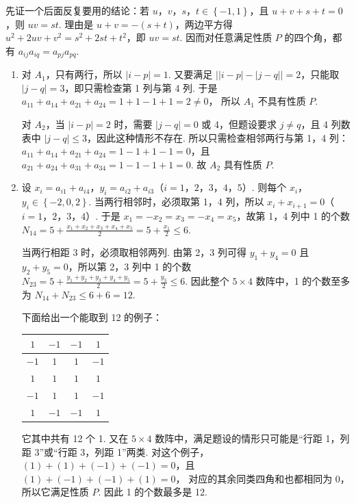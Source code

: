 \begin{solution}
先证一个后面反复要用的结论：若 \(u\)，\(v\)，\(s\)，\(t\in \left\{ -1,1 \right\}\)，且 \( u+v+s+t=0 \)，则 \( uv=st \). 理由是 \( u+v=-(s+t) \)，两边平方得 \( u^2+2uv+v^2=s^2+2st+t^2 \)，即 \( uv=st \). 因而对任意满足性质 \(P\) 的四个角，都有 \( a_{ij}a_{iq}=a_{pj}a_{pq} \).

\begin{enumerate}
\item 对 \(A_1\)，只有两行，所以 \( \left| i-p \right|=1 \). 又要满足 \( \left| \left| i-p \right|-\left| j-q \right| \right|=2 \)，只能取 \( \left| j-q \right|=3 \)，即只需检查第 1 列与第 4 列. 于是 \( a_{11}+a_{14}+a_{21}+a_{24}=1+1-1+1=2\ne 0 \)，
所以 \(A_1\) 不具有性质 \(P\).

对 \(A_2\)，当 \( \left| i-p \right|=2 \) 时，需要 \( \left| j-q \right|=0 \) 或 4，但题设要求 \( j\ne q \)，且 4 列数表中 \( \left| j-q \right| \le 3 \)，因此这种情形不存在. 所以只需检查相邻两行与第 1，4 列：\( a_{11}+a_{14}+a_{21}+a_{24}=1-1+1-1=0 \)，且 \( a_{21}+a_{24}+a_{31}+a_{34}=1-1-1+1=0 \).
故 \(A_2\) 具有性质 \(P\).

\item 设 \( x_i=a_{i1}+a_{i4} \)，\( y_i=a_{i2}+a_{i3} \)（\(i=1\)，\(2\)，\(3\)，\(4\)，\(5\)）.
则每个 \(x_i\)，\(y_i\in \left\{ -2,0,2 \right\}\).
当两行相邻时，必须取第 1，4 列，所以 \( x_i+x_{i+1}=0 \)（\(i=1\)，\(2\)，\(3\)，\(4\)）. 于是 \( x_1=-x_2=x_3=-x_4=x_5 \)，故第 1，4 列中 1 的个数 \( N_{14}=5+\frac{x_1+x_2+x_3+x_4+x_5}{2}=5+\frac{x_1}{2}\le 6 \).

当两行相距 3 时，必须取相邻两列. 由第 2，3 列可得 \( y_1+y_4=0 \) 且 \( y_2+y_5=0 \)，所以第 2，3 列中 1 的个数 \( N_{23}=5+\frac{y_1+y_2+y_3+y_4+y_5}{2}=5+\frac{y_3}{2}\le 6 \).
因此整个 \( 5\times 4 \) 数阵中，1 的个数至多为 \( N_{14}+N_{23}\le 6+6=12 \).

下面给出一个能取到 12 的例子：
\begin{center}
\begin{tabular}{|c|c|c|c|}
\hline
\(1\) & \(-1\) & \(-1\) & \(1\) \\
\hline
\(-1\) & \(1\) & \(1\) & \(-1\) \\
\hline
\(1\) & \(1\) & \(1\) & \(1\) \\
\hline
\(-1\) & \(1\) & \(1\) & \(-1\) \\
\hline
\(1\) & \(-1\) & \(-1\) & \(1\) \\
\hline
\end{tabular}
\end{center}
它其中共有 12 个 1. 又在 \( 5\times 4 \) 数阵中，满足题设的情形只可能是“行距 1，列距 3”或“行距 3，列距 1”两类. 对这个例子，\( \left( 1 \right)+\left( 1 \right)+\left( -1 \right)+\left( -1 \right)=0 \)，且 \( \left( 1 \right)+\left( -1 \right)+\left( -1 \right)+\left( 1 \right)=0 \)，
对应的其余同类四角和也都相同为 0，所以它满足性质 \(P\). 因此 1 的个数最多是 12.


\end{enumerate}
\end{solution}
